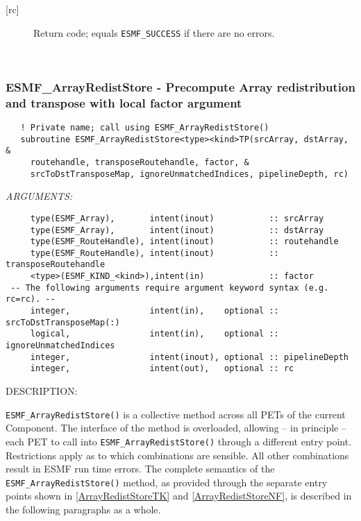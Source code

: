 \begin{description}
     \item [{[rc]}]
       Return code; equals {\tt ESMF\_SUCCESS} if there are no errors.
     \end{description}
   
 
\mbox{}\hrulefill\ 
 
\subsubsection [ESMF\_ArrayRedistStore] {ESMF\_ArrayRedistStore - Precompute Array redistribution and transpose with local factor argument}


  
\begin{verbatim}   ! Private name; call using ESMF_ArrayRedistStore()
   subroutine ESMF_ArrayRedistStore<type><kind>TP(srcArray, dstArray, &
     routehandle, transposeRoutehandle, factor, &
     srcToDstTransposeMap, ignoreUnmatchedIndices, pipelineDepth, rc)\end{verbatim}{\em ARGUMENTS:}
\begin{verbatim}     type(ESMF_Array),       intent(inout)           :: srcArray
     type(ESMF_Array),       intent(inout)           :: dstArray
     type(ESMF_RouteHandle), intent(inout)           :: routehandle
     type(ESMF_RouteHandle), intent(inout)           :: transposeRoutehandle
     <type>(ESMF_KIND_<kind>),intent(in)             :: factor
 -- The following arguments require argument keyword syntax (e.g. rc=rc). --
     integer,                intent(in),    optional :: srcToDstTransposeMap(:)
     logical,                intent(in),    optional :: ignoreUnmatchedIndices
     integer,                intent(inout), optional :: pipelineDepth
     integer,                intent(out),   optional :: rc\end{verbatim}
{\sf DESCRIPTION:\\ }


   \label{ArrayRedistStoreTK}
   {\tt ESMF\_ArrayRedistStore()} is a collective method across all PETs of the
   current Component. The interface of the method is overloaded, allowing 
   -- in principle -- each PET to call into {\tt ESMF\_ArrayRedistStore()}
   through a different entry point. Restrictions apply as to which combinations
   are sensible. All other combinations result in ESMF run time errors. The
   complete semantics of the {\tt ESMF\_ArrayRedistStore()} method, as provided
   through the separate entry points shown in \ref{ArrayRedistStoreTK} and
   \ref{ArrayRedistStoreNF}, is described in the following paragraphs as a whole.
  
